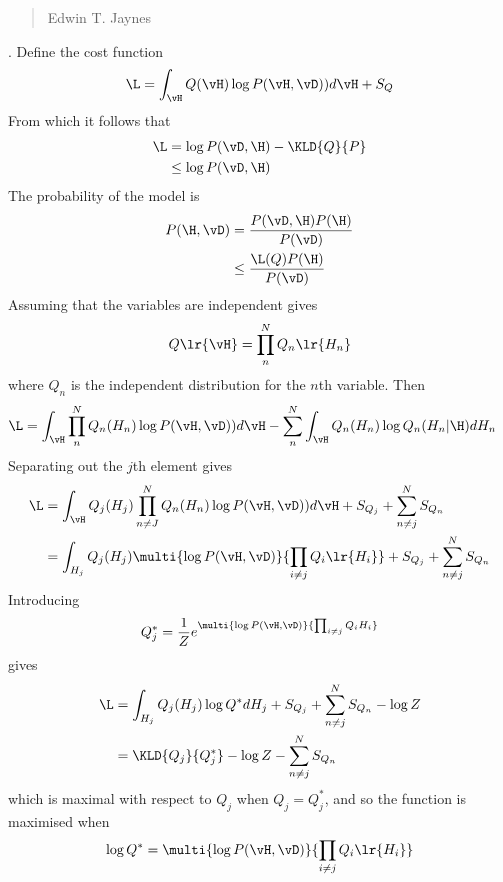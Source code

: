 {{\begin{quote}
\flushright Edwin T. Jaynes\cite{Jaynes1965}
\end{quote}
}.
Define the  cost function
\begin{align}
  \L =  \int_\vH Q(\vH) \log P(\vH,\vD) ) d\vH +S_Q  
\end{align}
From which it follows that
\begin{align}
  \L &=   \log P(\vD,\H) - \KLD{Q}{P} \\
     &\le \log P(\vD,\H)
\end{align}
The probability of the model is 
\begin{align}
  P(\H, \vD) &=    \frac{P(\vD, \H) P(\H)}{P(\vD)}\\
             &\le  \frac{\L(Q)P(\H)}{P(\vD)}
\end{align}
Assuming that the variables are independent gives
\begin{align}
Q\lr{\vH} = \prod_n^N Q_n\lr{H_n}
\end{align}
where $Q_n$ is the independent distribution for the $n$th variable.
Then 
\begin{align}
  \L&=  \int_\vH \prod_n^NQ_n(H_n) \log P(\vH,\vD) ) d\vH - \sum_n^N \int_\vH Q_n(H_n)  \log Q_n(H_n|\H) dH_n
\end{align}
Separating out the $j$th element gives
\begin{align}
  \L &= \int_\vH Q_j(H_j)\prod_{n\ne J}^NQ_n(H_n) \log P(\vH,\vD) ) d\vH + S_{Q_j} +  \sum_{n\ne j}^N S_{Q_{n}}
   \\ &= \int_{H_j} Q_j(H_j) \multi{\log P(\vH,\vD)}{\prod_{i\ne j} Q_i\lr{H_i}} +S_{Q_j} +  \sum_{n\ne j}^N S_{Q_{n}}
\end{align}
Introducing
\begin{align}
  Q^\ast_j = \frac{1}{Z}e^{\multi{\log P(\vH,\vD)}{\prod_{i\ne j} Q_i{H_i}}}
\end{align}
gives
\begin{align}
\L &= \int_{H_j} Q_j(H_j) \log Q^\ast dH_j  +S_{Q_j} +  \sum_{n\ne j}^N S_{Q_{n}} - \log Z
\\ &= \KLD{Q_j}{Q^\ast_j}  - \log Z -  \sum_{n\ne j}^N S_{Q_{n}} 
\end{align}
which is maximal with respect to $Q_j$ when $Q_j = Q^\ast_j$, and so the function is maximised when
\begin{align}
  \log Q^\ast = \multi{\log P(\vH,\vD)}{\prod_{i\ne j} Q_i\lr{H_i}}
\end{align}
 
}
